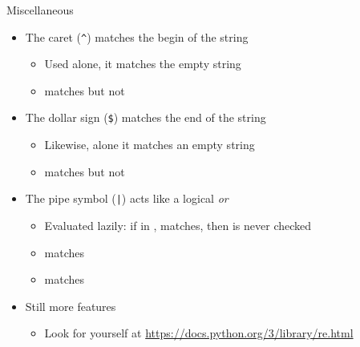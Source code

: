 \begin{frame}{Miscellaneous}
%
\begin{itemize}
\item The caret (\texttt{\textasciicircum}) matches the begin of the string
	\begin{itemize}
	\item Used alone, it matches the empty string
	\item[\Thus]  matches  but not 
	\end{itemize}
\item The dollar sign (\texttt{\$}) matches the end of the string
	\begin{itemize}
	\item Likewise, alone it matches an empty string
	\item[\Thus]  matches  but not 
	\end{itemize}
\pause
\item The pipe symbol (\texttt{|}) acts like a logical \emph{or}
	\begin{itemize}
	\item Evaluated lazily: if in ,  matches, then  is never checked
	\item[\Thus]  matches 
	\item[\Thus]  matches 
	\end{itemize}
\pause
\item Still more features
	\begin{itemize}
	\item Look for yourself at \url{https://docs.python.org/3/library/re.html}
	\end{itemize}
\end{itemize}
%
\end{frame}


